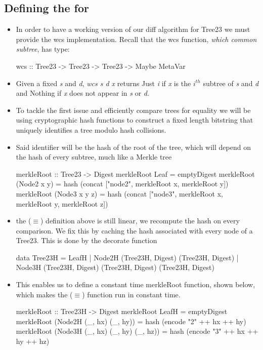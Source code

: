 \subsection{Defining the  for }

\begin{itemize}
    \item In order to have a working version of our diff algorithm for Tree23 we must provide the wcs implementation. Recall that the wcs function, \textit{which common subtree}, has type:
    \begin{haskell}
        wcs :: Tree23 -> Tree23 -> Tree23 -> Maybe MetaVar
    \end{haskell}
    \item Given a fixed \textit{s} and \textit{d}, \textit{wcs s d x} returns Just \textit{i} if \textit{x} is the $i^{th}$ subtree of
    \textit{s} and \textit{d} and Nothing if \textit{x} does not appear in \textit{s} or \textit{d}.
    \item To tackle the first issue and efficiently compare trees for equality we will be using cryptographic hash functions to construct a fixed length bitstring that uniquely identifies a tree modulo hash collisions.
    \item Said identifier will be the hash of the root of the tree, which will depend on the hash of every subtree, much like a Merkle tree
    \begin{haskell}
        merkleRoot :: Tree23 -> Digest
        merkleRoot Leaf = emptyDigest
        merkleRoot (Node2 x y)
            = hash (concat ["node2", merkleRoot x, merkleRoot y])
        merkleRoot (Node3 x y z)
            = hash (concat ["node3", merkleRoot x, merkleRoot y, merkleRoot z])
    \end{haskell}
    \item the ($\equiv$) definition above is still
    linear, we recompute the hash on every comparison. We fix this by caching the hash associated with every node of a Tree23. This is done by the decorate function
    \begin{haskell}
        data Tree23H = LeafH
                     | Node2H (Tree23H, Digest) (Tree23H, Digest)
                     | Node3H (Tree23H, Digest) 
                              (Tree23H, Digest) 
                              (Tree23H, Digest)
    \end{haskell}
    \item This enables us to define a constant time merkleRoot function, shown below, which makes the ($\equiv$) function run in constant time.
    \begin{haskell}
        merkleRoot :: Tree23H -> Digest
        merkleRoot LeafH = emptyDigest
        merkleRoot (Node2H (_, hx) (_, hy)) 
            = hash (encode "2" ++ hx ++ hy)
        merkleRoot (Node3H (_, hx) (_, hy) (_, hz))
            = hash (encode "3" ++ hx ++ hy ++ hz)
    \end{haskell}
\end{itemize}